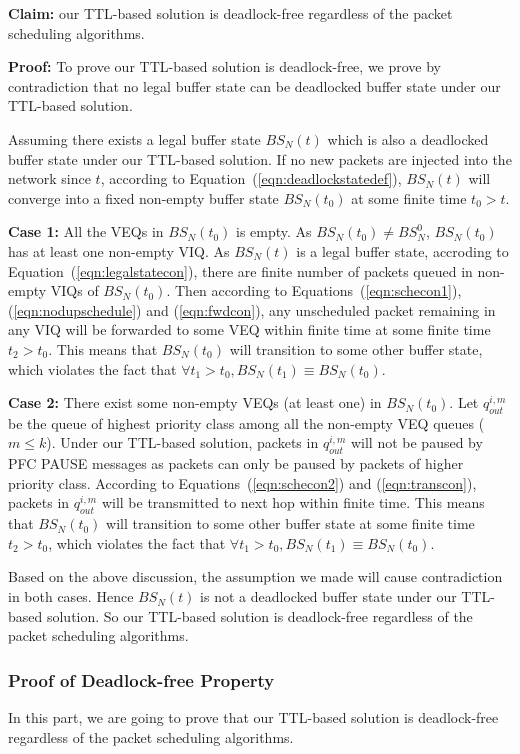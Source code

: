 \textbf{Claim:} our TTL-based solution is deadlock-free regardless of the packet scheduling algorithms.

\textbf{Proof:} To prove our TTL-based solution is deadlock-free, we prove by contradiction that no legal buffer state can be deadlocked buffer state under our TTL-based solution.

Assuming there exists a legal buffer state  $BS_N(t)$ which is also a deadlocked buffer state under our TTL-based solution. If no new packets are injected into the network since $t$, according to Equation~(\ref{eqn:deadlockstatedef}), $BS_N(t)$ will converge into a fixed non-empty buffer state $BS_N(t_0)$ at some finite time $t_0>t$. 


\textbf{Case 1:} All the VEQs in $BS_N(t_0)$ is empty. As $BS_N(t_0) \neq BS^0_N$, $BS_N(t_0)$ has at least one non-empty VIQ. As $BS_N(t)$ is a legal buffer state, accroding to Equation~(\ref{eqn:legalstatecon}), there are finite number of packets queued in non-empty VIQs of $BS_N(t_0)$. Then according to Equations~(\ref{eqn:schecon1}), (\ref{eqn:nodupschedule}) and (\ref{eqn:fwdcon}), any unscheduled packet remaining in any VIQ will be forwarded to some VEQ within finite time at some finite time $t_2>t_0$. This means that $BS_N(t_0)$ will transition to some other buffer state, which violates the fact that $\forall t_1>t_0, BS_N(t_1)\equiv BS_N(t_0)$.

\textbf{Case 2:} There exist some non-empty VEQs (at least one) in $BS_N(t_0)$. Let $q_{out}^{i,m}$ be the queue of highest priority class among all the non-empty VEQ queues ($m\leq k$). Under our TTL-based solution, packets in $q_{out}^{i,m}$ will not be paused by PFC PAUSE messages as packets can only be paused by packets of higher priority class. According to Equations~(\ref{eqn:schecon2}) and (\ref{eqn:transcon}), packets in $q_{out}^{i,m}$ will be transmitted to next hop within finite time. This means that $BS_N(t_0)$ will transition to some other buffer state  at some finite time $t_2>t_0$, which violates the fact that $\forall t_1>t_0, BS_N(t_1)\equiv BS_N(t_0)$.

Based on the above discussion, the assumption we made will cause contradiction in both cases. Hence $BS_N(t)$ is not a deadlocked buffer state under our TTL-based solution. So our TTL-based solution is deadlock-free regardless of the packet scheduling algorithms.
    

\subsubsection{Proof of Deadlock-free Property}\label{subsec:proof}
In this part, we are going to prove that our TTL-based solution is deadlock-free regardless of the packet scheduling algorithms.

